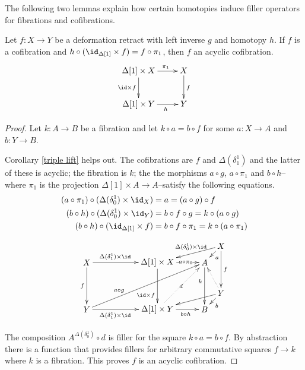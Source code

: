 \documentclass{tac}
\newcommand\hide[1]{}
\newcommand\of{:}
\newcommand\simplex\Delta
\begin{document}
The following two lemmas explain how certain homotopies induce filler operators for fibrations and cofibrations. 

\begin{lemma} Let $f\of X\to Y$ be a deformation retract with left inverse $g$ and homotopy $h$. If $f$ is a cofibration and $h\circ(\id_{\simplex[1]}\times f) = f\circ \pi_1$, then $f$ an acyclic cofibration.  \label{retract is acyclic}
\[\xymatrix{
\simplex[1]\times X \ar[r]^(.6){\pi_1}\ar[d]_{\id\times f} & X\ar[d]^f\\
\simplex[1]\times Y \ar[r]_(.6)h & Y
}\]
\end{lemma}

\begin{proof} 
Let $k\of A\to B$ be a fibration and let $k\circ a = b\circ f$ for some $a\of X\to A$ and $b\of Y\to B$. 

Corollary \ref{triple lift} helps out. The cofibrations are $f$ and $\simplex(\delta^1_1)$ and the latter of these is acyclic; the fibration is $k$; the the morphisms $a\circ g$, $a\circ \pi_1$ and $b\circ h$--where $\pi_1$ is the projection $\simplex[1]\times A\to A$--satisfy the following equations.
\begin{align*} 
	(a\circ \pi_1)\circ (\simplex(\delta^1_0)\times\id_X) &= a = (a\circ g)\circ f\\
	(b\circ h)\circ (\simplex(\delta^1_0)\times\id_Y) &= b\circ f\circ g = k\circ (a\circ g)\\
	(b\circ h)\circ (\id_{\simplex[1]}\times f) &= b\circ f\circ \pi_1 = k\circ (a\circ \pi_1)
\end{align*}
\hide{\[\xymatrix{
X\ar[d]_f\ar@/^3ex/[rrr]^{\simplex(\delta^1_0)\times\id} &X\ar[d]_f \ar[rr]|(.4){\simplex(\delta^1_1)\times \id} && \simplex[1]\times X \ar[d]|(.6){\id\times f}\ar[r]|(.6){a\circ \pi_1} & A\ar[d]^k\\
Y\ar@/_3ex/[rrr]_{\simplex(\delta^1_0)\times\id}&Y \ar[rr]|(.4){\simplex(\delta^1_1)\times \id}\ar[urrr]^(.3){a\circ g} && \simplex[1]\times Y\ar[r]|(.6){b\circ h}\ar@{.>}[ur]_d & B
}\]}
\[\xy
(0,20)*+{X}="X1",(30,20)*+{\simplex[1]\times X}="X01",(50,20)*+{A}="A",(57,27)*+{X}="X0",
(0,0)*+{Y}="Y1",(30,0)*+{\simplex[1]\times Y}="Y01",(50,0)*+{B}="B",(57,7)*+{Y}="Y0"
\ar^f "X0";"Y0" \ar_(.4){\simplex(\delta^1_0)\times\id} "X0";"X01" \ar^a "X0";"A"
\ar_f "X1";"Y1" \ar^(.4){\simplex(\delta^1_1)\times\id} "X1";"X01" 
\ar_(.7){\id\times f} "X01";"Y01" \ar|(.6){a\circ\pi_0} "X01";"A"
\ar_(.4)k "A";"B"
\ar "Y0";"Y01" \ar^b "Y0";"B" \ar@{.>} "Y0";"A"
\ar_(.4){\simplex(\delta^1_1)\times\id} "Y1";"Y01"
\ar^(.3){a\circ g} "Y1";"A"
\ar_(.6){b\circ h} "Y01";"B"
\ar@{.>}|d "Y01";"A"
\endxy\]

The composition $A^{\simplex(\delta^1_0)}\circ d$ is filler for the square $k\circ a = b\circ f$. By abstraction there is a function that provides fillers for arbitrary commutative squares $f\to k$ where $k$ is a fibration. This proves $f$ is an acyclic cofibration.
\end{proof}
\end{document}
